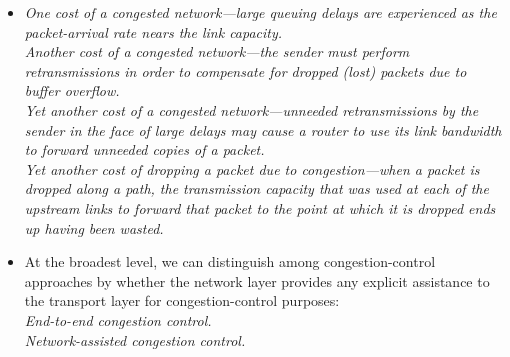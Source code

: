 \begin{itemize}
\item
\textit{One cost of a congested network---large queuing delays are experienced as the packet-arrival rate nears the link capacity.}\\
\textit{Another cost of a congested network---the sender must perform retransmissions in order to compensate for dropped (lost) packets due to buffer overflow.}\\
\textit{Yet another cost of a congested network---unneeded retransmissions by the sender in the face of large delays may cause a router to use its link bandwidth to forward unneeded copies of a packet.}\\
\textit{Yet another cost of dropping a packet due to congestion---when a packet is dropped along a path, the transmission capacity that was used at each of the upstream links to forward that packet to the point at which it is dropped ends up having been wasted.}

\item
At the broadest level, we can distinguish among congestion-control approaches by whether the network layer provides any explicit assistance to the transport layer for congestion-control purposes:\\
\textit{End-to-end congestion control.}\\
\textit{Network-assisted congestion control.}


































\end{itemize}